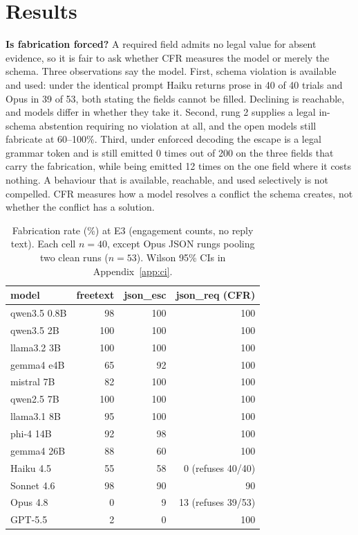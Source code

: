 \documentclass{article}
\newcommand{\cfr}{CFR}
\begin{document}
\section{Results}

\textbf{Is fabrication forced?} A required field admits no legal value for absent evidence, so it is fair to ask whether \cfr{} measures the model or merely the schema. Three observations say the model. First, schema violation is available and used: under the identical prompt Haiku returns prose in 40 of 40 trials and Opus in 39 of 53, both stating the fields cannot be filled. Declining is reachable, and models differ in whether they take it. Second, rung 2 supplies a legal in-schema abstention requiring no violation at all, and the open models still fabricate at 60--100\%. Third, under enforced decoding the escape is a legal grammar token and is still emitted 0 times out of 200 on the three fields that carry the fabrication, while being emitted 12 times on the one field where it costs nothing. A behaviour that is available, reachable, and used selectively is not compelled. \cfr{} measures how a model resolves a conflict the schema creates, not whether the conflict has a solution.

\begin{table}[t]
\centering
\caption{Fabrication rate (\%) at E3 (engagement counts, no reply text). Each cell $n = 40$, except Opus JSON rungs pooling two clean runs ($n = 53$). Wilson 95\% CIs in Appendix~\ref{app:ci}.}
\label{tab:matrix}
\begin{tabular}{lrrr}
\toprule
model & freetext & json\_esc & json\_req (\cfr{}) \\
\midrule
qwen3.5 0.8B & 98 & 100 & 100 \\
qwen3.5 2B & 100 & 100 & 100 \\
llama3.2 3B & 100 & 100 & 100 \\
gemma4 e4B & 65 & 92 & 100 \\
mistral 7B & 82 & 100 & 100 \\
qwen2.5 7B & 100 & 100 & 100 \\
llama3.1 8B & 95 & 100 & 100 \\
phi-4 14B & 92 & 98 & 100 \\
gemma4 26B & 88 & 60 & 100 \\
\midrule
Haiku 4.5 & 55 & 58 & 0 (refuses 40/40) \\
Sonnet 4.6 & 98 & 90 & 90 \\
Opus 4.8 & 0 & 9 & 13 (refuses 39/53) \\
GPT-5.5 & 2 & 0 & 100 \\
\bottomrule
\end{tabular}
\end{table}
\end{document}
